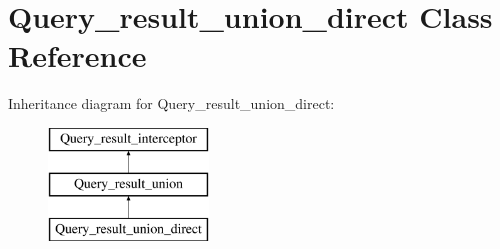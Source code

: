 \hypertarget{classQuery__result__union__direct}{}\section{Query\+\_\+result\+\_\+union\+\_\+direct Class Reference}
\label{classQuery__result__union__direct}
Inheritance diagram for Query\+\_\+result\+\_\+union\+\_\+direct\+:\begin{figure}[H]
\begin{center}
\leavevmode
\includegraphics[height=3.000000cm]{classQuery__result__union__direct}
\end{center}
\end{figure}
